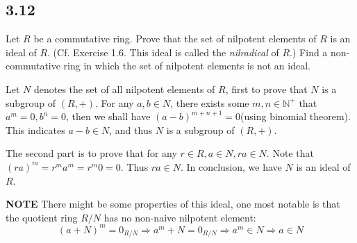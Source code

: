 \documentclass[a4paper, pdf, 12pt]{article}
\makeatletter
\renewenvironment{proof}[1][\proofname]{\par
  \pushQED{\qed}%
  \normalfont \topsep6\p@\@plus6\p@\relax
  \trivlist
  \item[%
    \hskip\labelsep
    \normalfont\bfseries %
    #1%
    \@addpunct{.}%
  ]\ignorespaces
}{%
  \popQED\endtrivlist\@endpefalse
}
\let\qed\relax %
\DeclareRobustCommand{\qed}{%
  \ifmmode \mathqed
  \else
    \leavevmode\unskip\penalty\@M\hbox{}\nobreak\hspace{.5em minus .1em}%
    \hbox{\qedsymbol}%
  \fi
}
\makeatother
\begin{document}
\subsection*{3.12}
Let $R$ be a commutative ring. Prove that the set of nilpotent elements of $R$ is an ideal of $R$. 
(Cf. Exercise 1.6. This ideal is called the \textit{nilradical} of $R$.)
Find a non-commutative ring in which the set of nilpotent elements is not an ideal.
\begin{proof}
  Let $N$ denotes the set of all nilpotent elements of $R$, first to prove that 
  $N$ is a subgroup of $(R, +)$. For any $a, b\in N$, there exists some $m,n\in \mathbb{N}^{+}$
  that $a^{m} = 0, b^{n} = 0$, then we shall have $(a-b)^{m+n+1} = 0$(using binomial theorem). This
  indicates $a-b\in N$, and thus $N$ is a subgroup of $(R, +)$.

  The second part is to prove that for any $r\in R, a\in N, ra\in N$. Note that $(ra)^{m} = r^{m}a^{m} = r^{m}0=0$.
  Thus $ra\in N$. In conclusion, we have $N$ is an ideal of $R$.
 
  \noindent
  \textbf{NOTE} There might be some properties of this ideal, one most notable is that the 
  quotient ring $R/N$ has no non-naive nilpotent element:
  $$
  (a+N)^{m} = 0_{R/N}\Rightarrow a^{m} + N = 0_{R/N}\Rightarrow a^{m}\in N\Rightarrow a\in N
  $$
\end{proof}
\end{document}
